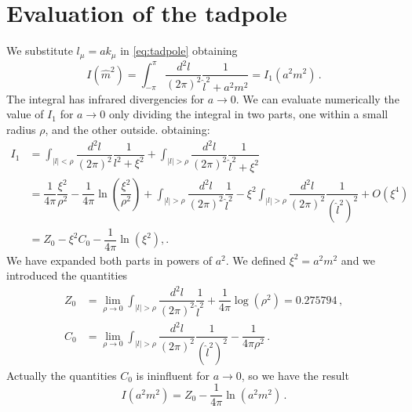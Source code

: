 \documentclass[12pt,a4paper]{report}
\begin{document}
 \section{Evaluation of the tadpole}
 
 We substitute $l_\mu = a k_\mu$ in \eqref{eq:tadpole} obtaining \begin{equation}
 I(\hat m^2) =  \int_{-\pi}^\pi \dfrac{d^2l}{(2 \pi)^2}\dfrac{1}{\hat l^2 + a^2m^2} =  I_1(a^2 m^2) \,.
 \end{equation} The integral has infrared divergencies for $a \to 0$. We can evaluate numerically the value of $I_1$ for $a\to 0$ only dividing the integral in two parts, one within a small radius $\rho$, and the other outside.
 obtaining:
 \begin{align}
 I_1 &= \int_{|l|< \rho} \dfrac{d^2l}{(2 \pi)^2} \dfrac{1}{l^2 + \xi^2} +\int_{|l|> \rho} \dfrac{d^2l}{(2 \pi)^2} \dfrac{1}{\hat l^2 + \xi^2}  \\
 &= \dfrac{1}{4 \pi} \dfrac{\xi^2}{\rho^2} - \dfrac{1}{4 \pi} \ln \left( \dfrac{\xi^2}{\rho^2}\right) + \int_{|l|> \rho} \dfrac{d^2l}{(2 \pi)^2} \dfrac{1}{\hat l^2 } - \xi^2 \int_{|l|> \rho} \dfrac{d^2l}{(2 \pi)^2} \dfrac{1}{(\hat l^2)^2}  +O(\xi^4) \nonumber \\
 &= Z_0 -\xi^2 C_0 -\dfrac{1}{4 \pi} \ln(\xi^2) ,. \nonumber
 \end{align} We have expanded both parts in powers of $a^2$. We defined $\xi^2 = a^2 m^2$ and we introduced the quantities
\begin{align}
Z_0 &= \lim_{\rho \to 0} \int_{|l|> \rho}  \dfrac{d^2l}{(2 \pi)^2} \dfrac{1}{\hat l^2 } + \dfrac{1}{4 \pi} \log(\rho^2)=0.275794 \,, \\
C_0 &= \lim_{\rho \to 0}  \int_{|l|> \rho}  \dfrac{d^2l}{(2 \pi)^2} \dfrac{1}{(\hat l^2)^2 } - \dfrac{1}{4 \pi \rho^2} \,.
\end{align} Actually the quantities $C_0$ is ininfluent for $a\to 0$, so we have the result \begin{equation}
I(a^2 m^2)= Z_0 - \dfrac{1}{4 \pi} \ln(a^2m^2) \,.
\end{equation}
 
 
 
\end{document}
